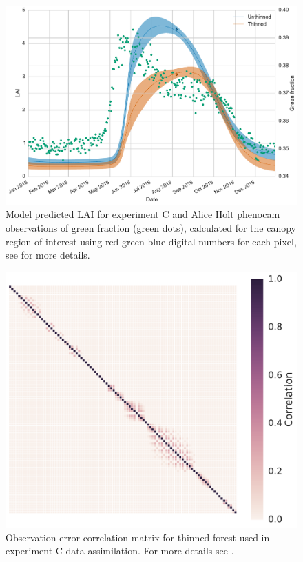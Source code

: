 \begin{figure}[ht]
 \noindent\includegraphics[width=30pc]{chapter/chapter7/pheno_lai.pdf}
    \caption{Model predicted LAI for experiment C and Alice Holt phenocam observations of green fraction (green dots), calculated for the canopy region of interest using red-green-blue digital numbers for each pixel, see \citet{mizunuma2013relationship} for more details.} \label{chap7:fig:pheno_obs}
\end{figure}


\begin{figure}[ht]
 \noindent\includegraphics[width=30pc]{chapter/chapter7/rmat_eastc.pdf}
    \caption{Observation error correlation matrix for thinned forest used in experiment C data assimilation. For more details see \citet{Pinnington2016299}.} \label{chap7:fig:rmat_ut}
\end{figure}


